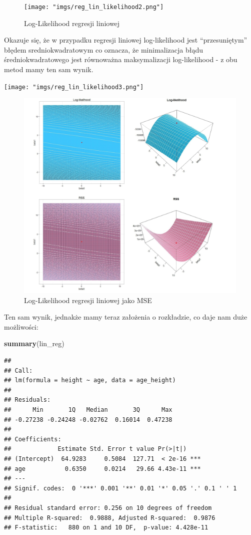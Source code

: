 \documentclass[
]{article}
\newenvironment{Shaded}{\begin{snugshade}}{\end{snugshade}}
\newcommand{\KeywordTok}[1]{\textcolor[rgb]{0.13,0.29,0.53}{\textbf{#1}}}
\newcommand{\NormalTok}[1]{#1}
\begin{document}
\begin{figure}
\centering
\texttt{[image: "imgs/reg\_lin\_likelihood2.png"]}
\caption{Log-Likelihood regresji liniowej}
\end{figure}

Okazuje się, że w przypadku regresji liniowej log-likelihood jest
``przesuniętym'' błędem sredniokwadratowym co oznacza, że minimalizacja
błądu średniokwadratowego jest równoważna maksymalizacji log-likelihood
- z obu metod mamy ten sam wynik.

\texttt{[image: "imgs/reg\_lin\_likelihood3.png"]}

\begin{figure}
\centering
\includegraphics{"imgs/reg_lin_likelihood4.png"}
\caption{Log-Likelihood regresji liniowej jako MSE}
\end{figure}

Ten sam wynik, jednakże mamy teraz założenia o rozkładzie, co daje nam
duże możliwości:

\begin{Shaded}
\begin{Highlighting}[]
\KeywordTok{summary}\NormalTok{(lin\_reg)}
\end{Highlighting}
\end{Shaded}

\begin{verbatim}
## 
## Call:
## lm(formula = height ~ age, data = age_height)
## 
## Residuals:
##      Min       1Q   Median       3Q      Max 
## -0.27238 -0.24248 -0.02762  0.16014  0.47238 
## 
## Coefficients:
##             Estimate Std. Error t value Pr(>|t|)    
## (Intercept)  64.9283     0.5084  127.71  < 2e-16 ***
## age           0.6350     0.0214   29.66 4.43e-11 ***
## ---
## Signif. codes:  0 '***' 0.001 '**' 0.01 '*' 0.05 '.' 0.1 ' ' 1
## 
## Residual standard error: 0.256 on 10 degrees of freedom
## Multiple R-squared:  0.9888, Adjusted R-squared:  0.9876 
## F-statistic:   880 on 1 and 10 DF,  p-value: 4.428e-11
\end{verbatim}
\end{document}
